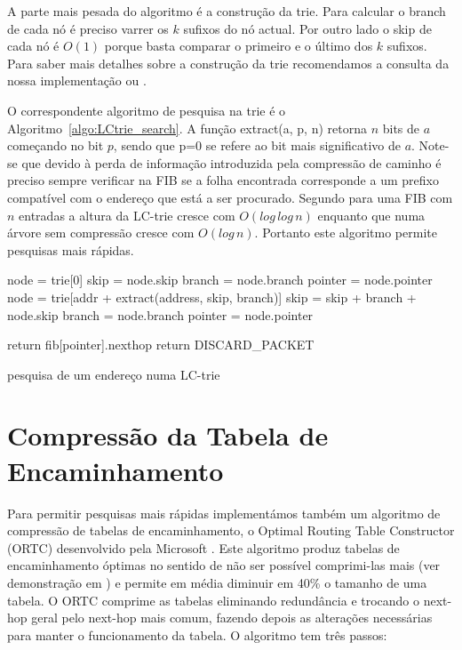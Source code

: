 \documentclass[10pt,a4paper]{article}
\makeatletter
\newcommand{\nosemic}{\renewcommand{\@endalgocfline}{\relax}}	%
\makeatother
\begin{document}
A parte mais pesada do algoritmo é a construção da trie. Para calcular o branch de cada nó é preciso varrer os $k$ sufixos do nó actual. Por outro lado o skip de cada nó é $O(1)$ porque basta comparar o primeiro e o último dos $k$ sufixos. Para saber mais detalhes sobre a construção da trie recomendamos a consulta da nossa implementação ou \cite{SNilsson99}.

O correspondente algoritmo de pesquisa na trie é o Algoritmo~\ref{algo:LCtrie_search}. A função extract(a, p, n) retorna $n$ bits de $a$ começando no bit $p$, sendo que p=0 se refere ao bit mais significativo de $a$. Note-se que devido à perda de informação introduzida pela compressão de caminho é preciso sempre verificar na FIB se a folha encontrada corresponde a um prefixo compatível com o endereço que está a ser procurado. Segundo \cite{SNilsson99} para uma FIB com $n$ entradas a altura da \mbox{LC-trie} cresce com $O(log \, log \, n)$ enquanto que numa árvore sem compressão cresce com $O(log \, n)$. Portanto este algoritmo permite pesquisas mais rápidas.

\begin{algorithm}
	\label{algo:LCtrie_search}
	\nosemic
	node = trie[0] \;
	skip = node.skip \;
	branch = node.branch \;
	pointer = node.pointer \;
	{
		node = trie[addr + extract(address, skip, branch)] \;
		skip = skip + branch + node.skip \;
		branch = node.branch \;
		pointer = node.pointer \;
	}
	
	{
		return fib[pointer].nexthop \;
	}
	\Else
	{
		return DISCARD\_PACKET \;
	}
		\begin{comment}
			node = trie[0]
			skip = node.skip
			branch = node.branch
			pointer = node.pointer
			
			while( branch != 0 )
			{
				node = trie[addr + extract(address, skip, branch)]
				skip = skip + branch + node.skip
				branch = node.branch
				pointer = node.pointer
			}
			
			if( address starts with fib[pointer].prefix )
				return fib[pointer].nexthop
			else
				return DISCARD_PACKET \\
		\end{comment}
	\caption{pesquisa de um endereço numa LC-trie}
\end{algorithm}

\section{Compressão da Tabela de Encaminhamento}
	Para permitir pesquisas mais rápidas implementámos também um algoritmo de compressão de tabelas de encaminhamento, o Optimal Routing Table Constructor (ORTC) desenvolvido pela Microsoft \cite{DravesKSZ99}. Este algoritmo produz tabelas de encaminhamento óptimas no sentido de não ser possível comprimi-las mais (ver demonstração em \cite{DravesKSZ99}) e permite em média diminuir em 40\% o tamanho de uma tabela.
	O ORTC comprime as tabelas eliminando redundância e trocando o next-hop geral pelo next-hop mais comum, fazendo depois as alterações necessárias para manter o funcionamento da tabela. O algoritmo tem três passos: 
\end{document}
